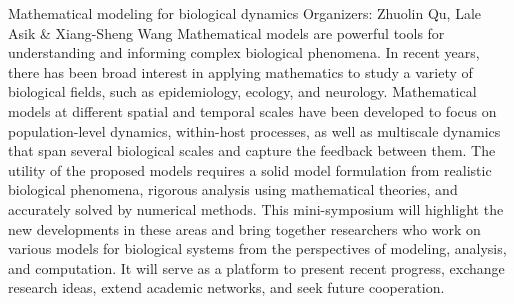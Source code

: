 \label{mini03}


\miniabs
{Mathematical modeling for biological dynamics}
{Organizers: Zhuolin Qu, Lale Asik \& Xiang-Sheng Wang}
{Mathematical models are powerful tools for understanding and informing complex biological phenomena. In recent years, there has been broad interest in applying mathematics to study a variety of biological fields, such as epidemiology, ecology, and neurology. Mathematical models at different spatial and temporal scales have been developed to focus on population-level dynamics, within-host processes, as well as multiscale dynamics that span several biological scales and capture the feedback between them. The utility of the proposed models requires a solid model formulation from realistic biological phenomena, rigorous analysis using mathematical theories, and accurately solved by numerical methods. This mini-symposium will highlight the new developments in these areas and bring together researchers who work on various models for biological systems from the perspectives of modeling, analysis, and computation. It will serve as a platform to present recent progress, exchange research ideas, extend academic networks, and seek future cooperation.}

